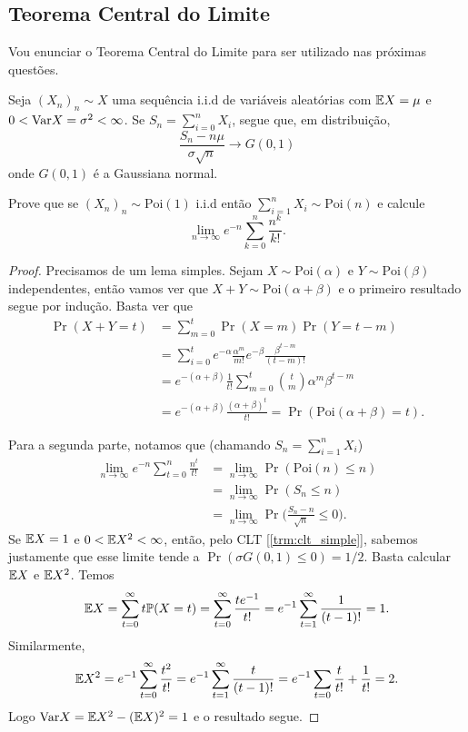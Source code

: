 \subsection{Teorema Central do Limite}
Vou enunciar o Teorema Central do Limite para ser utilizado nas
próximas questões.
\begin{theorem}
	\label{trm:clt_simple}
	Seja $(X_n)_n \sim X$ uma sequência i.i.d de variáveis aleatórias
	com $\mathbb{E} X = \mu$ e $0 < \text{Var} X = \sigma^2 < \infty$. Se $S_n =
	\sum_{i = 0}^n X_i$,
	segue que, em distribuição,
	\[
		\frac{S_n - n\mu}{\sigma\sqrt{n}} \to G(0,1)
	\]
	onde $G(0,1)$ é a Gaussiana normal.

\end{theorem}
\begin{exercise}
	Prove que se $(X_n)_n \sim \text{Poi}(1)$ i.i.d então $\sum_{i=1}^n
	X_i \sim \text{Poi}(n)$ e calcule
	\[
		\lim_{n\to\infty} e^{-n}\sum_{k=0}^n \frac{n^k}{k!}.
	\]
\end{exercise}
\begin{proof}
	Precisamos de um lema simples. Sejam $X \sim \text{Poi}(\alpha)$ e
	$Y \sim \text{Poi}(\beta)$ independentes,
	então vamos ver que $X + Y \sim \text{Poi}(\alpha + \beta)$ e o
	primeiro resultado segue por indução.
	Basta ver que
	\begin{align*}
		\Pr(X + Y = t) &= \sum_{m = 0}^{t}\Pr(X = m)\Pr(Y = t - m)\\
		&= \sum_{i = 0}^t
		e^{-\alpha}\frac{\alpha^m}{m!}e^{-\beta}\frac{\beta^{t - m}}{(t-m)!}\\
		&= e^{-(\alpha + \beta)}\frac{1}{t!}\sum_{m = 0}^t
		\binom{t}{m}\alpha^m \beta^{t-m}\\
		&= e^{-(\alpha + \beta)} \frac{(\alpha + \beta)^t}{t!} =
		\Pr(\text{Poi}(\alpha + \beta) = t).
	\end{align*}

	Para a segunda parte, notamos que (chamando $S_n = \sum_{i = 1}^n X_i$)
	\begin{align*}
		\lim_{n\to\infty} e^{-n}\sum_{t = 0}^n \frac{n^t}{t!} &= \lim_{n
		\to \infty} \Pr(\text{Poi}(n) \leq n)\\
		&= \lim_{n \to \infty}\Pr(S_n\leq n)\\
		&= \lim_{n \to \infty} \Pr\bigg(\frac{S_n - n}{\sqrt{n}} \leq 0\bigg).
	\end{align*}
	Se $\mathbb{E} X = 1$ e $0 <\mathbb{E} X^2 < \infty$, então, pelo CLT
	[\ref{trm:clt_simple}], sabemos justamente que esse limite tende a
	$\Pr(\sigma G(0,1) \leq 0) = 1/2$.
	Basta calcular $\mathbb{E} X$ e $\mathbb{E} X^2$. Temos
	\[
		\mathbb{E} X = \sum_{t = 0}^{\infty} t \mathbb{P}(X = t) = \sum_{t = 0}^\infty
		\frac{te^{-1}}{t!} = e^{-1}\sum_{t = 1}^\infty \frac{1}{(t-1)!} = 1.
	\]
	Similarmente,
	\[
		\mathbb{E} X^2 =e^{-1}\sum_{t = 0}^\infty \frac{t^2}{t!} = e^{-1} \sum_{t
		= 1}^\infty \frac{t}{(t-1)!} = e^{-1}\sum_{t = 0} \frac{t}{t!} +
		\frac{1}{t!} = 2.
	\]
	Logo $\text{Var} X = \mathbb{E} X^2 - (\mathbb{E} X)^2 = 1$ e o resultado segue.

\end{proof}


\pagebreak
